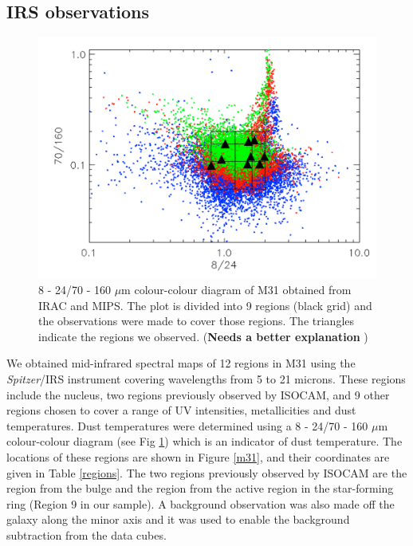 \subsection{IRS observations}
\label{sect:irs_obs}


\begin{figure}
\centering
\includegraphics[width = 8 cm]{./colormaps.png}
\caption{8 - 24/70 - 160 $\mu$m colour-colour diagram of M31 obtained from IRAC and MIPS. The plot is divided into 9 regions (black grid) and the observations were made to cover those regions. The triangles indicate the regions we observed. ({\bf Needs a better explanation} )}
\label{colourmaps}
\end{figure}

We obtained mid-infrared spectral maps of 12 regions in M31 using the {\em Spitzer}/IRS instrument \citep{IRS2004} covering wavelengths from 5 to 21 microns. These regions include the nucleus, two regions previously observed by ISOCAM, and 9 other regions chosen to cover a range of UV intensities, metallicities and dust temperatures. Dust temperatures were determined using a 8 - 24/70 - 160 $\mu$m colour-colour diagram (see Fig \ref{colourmaps}) which is an indicator of dust temperature. The locations of these regions are shown in Figure \ref{m31}, and their coordinates are given in Table \ref{regions}. The two regions previously observed by ISOCAM are the region from the bulge and the region from the active region in the star-forming ring (Region 9 in our sample). A background observation was also made off the galaxy along the minor axis and it was used to enable the background subtraction from the data cubes.


